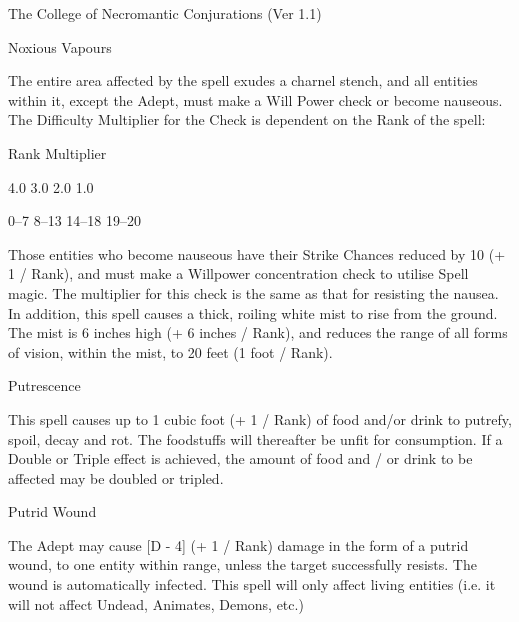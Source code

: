 \begin{Chapter}{The College of Necromantic Conjurations (Ver 1.1)}
\begin{spell}[G-6]{Noxious Vapours}
\begin{effects}
The entire area affected by the spell exudes a charnel stench, and all
entities within it, except the Adept, must make a Will Power check or
become nauseous.  The Difficulty Multiplier for the Check is dependent
on the Rank of the spell:

Rank  Multiplier 

4.0 
3.0 
2.0 
1.0 

0–7 
8–13 
14–18 
19–20 

Those entities who become nauseous have their Strike Chances reduced
by 10 (+ 1 / Rank), and must make a Willpower concentration check to
utilise Spell magic. The multiplier for this check is the same as that
for resisting the nausea.  In addition, this spell causes a thick,
roiling white mist to rise from the ground. The mist is 6 inches high
(+ 6 inches / Rank), and reduces the range of all forms of vision,
within the mist, to 20 feet (1 foot / Rank).
\end{effects}
\end{spell}

\begin{spell}[G-7]{Putrescence}
\begin{effects}
This spell causes up to 1 cubic foot (+ 1 / Rank) of food and/or drink
to putrefy, spoil, decay and rot.  The foodstuffs will thereafter be
unfit for consumption.  If a Double or Triple effect is achieved, the
amount of food and / or drink to be affected may be doubled or
tripled.
\end{effects}
\end{spell}

\begin{spell}[G-8]{Putrid Wound}
\begin{effects}
The Adept may cause [D - 4] (+ 1 / Rank) damage in the form of a
putrid wound, to one entity within range, unless the target
successfully resists.  The wound is automatically infected.  This
spell will only affect living entities (i.e. it will not affect
Undead, Animates, Demons, etc.)
\end{effects}
\end{spell}


\end{Chapter}
